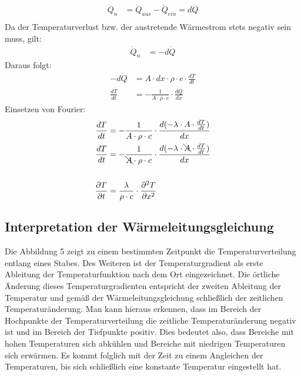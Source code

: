 \documentclass[a4paper,10pt]{article}
\begin{document}
\begin{align*}
\dot{Q}_n &= \dot{Q}_{aus} - \dot{Q}_{ein} = d \dot{Q} \\
\end{align*}
Da der Temperaturverlust bzw. der austretende Wärmestrom stets negativ sein muss, gilt:
\begin{align*}
\dot{Q}_n &= - d \dot{Q}
\end{align*}
Daraus folgt:
\begin{align*}
- d \dot{Q} &= A \cdot d x \cdot \rho \cdot c \cdot \frac{d T}{d t}\\
\frac{d T}{d t} &= - \frac{1}{A \cdot \rho \cdot c} \cdot \frac{d \dot{Q}}{d x}
\end{align*}
Einsetzen von Fourier:
\begin{align*}
\frac{d T}{d t} &= - \frac{1}{A \cdot \rho \cdot c} \cdot \frac{d (-\lambda \cdot A \cdot \frac{d T}{d t})}{d x} \\
\frac{d T}{d t} &= - \frac{1}{\bcancel{A} \cdot \rho \cdot c} \cdot \frac{d (-\lambda \cdot \bcancel{A} \cdot \frac{d T}{d t})}{d x} \\ 
\\
\frac{\partial T}{\partial t} &= \frac{\lambda}{\rho \cdot c} \cdot \frac{\partial^2T}{\partial x^2}
\end{align*}

\pp


\pagebreak
\subsection{Interpretation der Wärmeleitungsgleichung}
%
Die Abbildung 5 zeigt zu einem bestimmten Zeitpunkt die Temperaturverteilung entlang eines Stabes. Des Weiteren ist der Temperaturgradient als erste Ableitung der Temperaturfunktion nach dem Ort eingezeichnet. Die örtliche Änderung dieses Temperaturgradienten entspricht der zweiten Ableitung der Temperatur und gemäß der Wärmeleitungsgleichung schließlich der zeitlichen Temperaturänderung. Man kann hieraus erkennen, dass im Bereich der Hochpunkte der Temperaturverteilung die zeitliche Temperaturänderung negativ ist und im Bereich der Tiefpunkte positiv. Dies bedeutet also, dass Bereiche mit hohen Temperaturen sich abkühlen und Bereiche mit niedrigen Temperaturen sich erwärmen. Es kommt folglich mit der Zeit zu einem Angleichen der Temperaturen, bis sich schließlich eine konstante Temperatur eingestellt hat.
\pp
\end{document}
